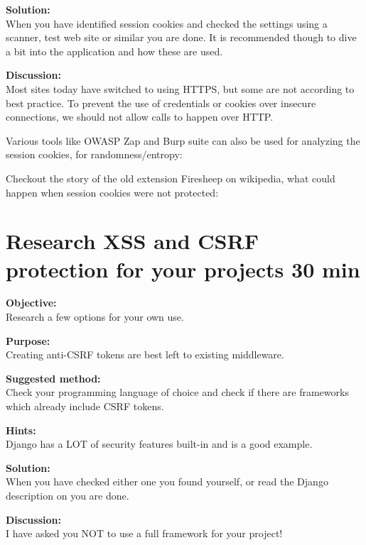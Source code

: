 \documentclass[a4paper,11pt,notitlepage]{report}
\begin{document}
{\bf Solution:}\\
When you have identified session cookies and checked the settings using a scanner, test web site or similar you are done. It is recommended though to dive a bit into the application and how these are used.

{\bf Discussion:}\\
Most sites today have switched to using HTTPS, but some are not according to best practice. To prevent the use of credentials or cookies over insecure connections, we should not allow calls to happen over HTTP.

Various tools like OWASP Zap and Burp suite can also be used for analyzing the session cookies, for randomness/entropy:\\


Checkout the story of the old extension Firesheep on wikipedia, what could happen when session cookies were not protected:\\



\chapter{Research XSS and CSRF protection for your projects 30 min}
\label{ex:research-middleware-csrf}

{\bf Objective:}\\
Research a few options for your own use.


{\bf Purpose:}\\
Creating anti-CSRF tokens are best left to existing middleware.

{\bf Suggested method:}\\
Check your programming language of choice and check if there are frameworks which already include CSRF tokens.


{\bf Hints:}\\
Django has a LOT of security features built-in and is a good example.

{\bf Solution:}\\
When you have checked either one you found yourself, or read the Django description on  you are done.

{\bf Discussion:}\\
I have asked you NOT to use a full framework for your project!
\end{document}
